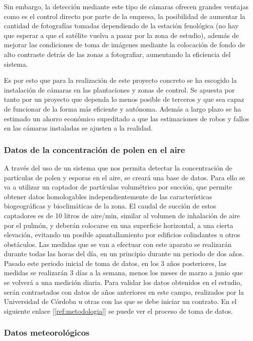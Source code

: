 \documentclass[12pt,oneside,a4paper]{article}
\numberwithin{figure}{section}
\begin{document}
Sin embargo, la detección mediante este tipo de cámaras ofrecen grandes ventajas como es el control directo por parte de la empresa, la posibilidad de aumentar la cantidad de fotografías tomadas dependiendo de la estación fenológica (no hay que esperar a que el satélite vuelva a pasar por la zona de estudio), además de mejorar las condiciones de toma de imágenes mediante la colocación de fondo de alto contraste detrás de las zonas a fotografiar, aumentando la eficiencia del sistema.

Es por esto que para la realización de este proyecto concreto se ha escogido la instalación de cámaras en las plantaciones y zonas de control. Se apuesta por tanto por un proyecto que dependa lo menos posible de terceros y que sea capaz de funcionar de la forma más eficiente y autónoma. Además a largo plazo se ha estimado un ahorro económico supeditado a que las estimaciones de robos y fallos en las cámaras instaladas se ajusten a la realidad.

\subsubsection{Datos de la concentración de polen en el aire}

A través del uso de un sistema que nos permita detectar la concentración de partículas de polen y esporas en el aire, se creará una base de datos. Para ello se va a utilizar un captador de partículas volumétrico por succión, que permite obtener datos homologables independientemente de las características biogeográficas y bioclimáticas de la zona. El caudal de succión de estos captadores es de 10 litros de aire/min, similar al volumen de inhalación de aire por el pulmón, y deberán colocarse en una superficie horizontal, a una cierta elevación, evitando un posible apantallamiento por edificios colindantes u otros obstáculos. Las medidas que se van a efectuar con este aparato se realizarán durante todas las horas del día, en un principio durante un periodo de dos años. Pasado este periodo inicial de toma de datos, en los 3 años posteriores, las medidas se realizarán 3 días a la semana, menos los meses de marzo a junio que se volverá a una medición diaria. Para validar los datos obtenidos en el estudio, serán contrastados con datos de años anteriores en este campo, realizados por la Universidad de Córdoba u otras con las que se debe iniciar un contrato. En el siguiente enlace [\ref{ref:metodologia}] se puede ver el proceso de toma de datos.


\subsubsection{Datos meteorológicos}
\end{document}

